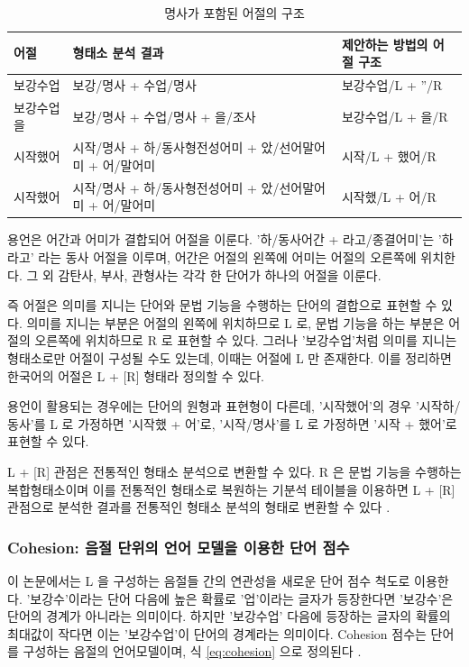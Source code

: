 \documentclass[11pt]{article}
\begin{document}
\begin{table}[H]
\small
\centering
\caption{명사가 포함된 어절의 구조}
\label{tab:three_example_of_begin}
\begin{tabular}{|l|l|l|}
\hline
\rowcolor[HTML]{EFEFEF} 
\textbf{어절} & \textbf{형태소 분석 결과} & \textbf{제안하는 방법의 어절 구조} \\ \hline
보강수업 & 보강/명사 + 수업/명사 & 보강수업/L + ''/R \\ \hline
보강수업을 & 보강/명사 + 수업/명사 + 을/조사 & 보강수업/L + 을/R \\ \hline
시작했어 & 시작/명사 + 하/동사형전성어미 + 았/선어말어미 + 어/말어미 & 시작/L + 했어/R \\ \hline
시작했어 & 시작/명사 + 하/동사형전성어미 + 았/선어말어미 + 어/말어미 & 시작했/L + 어/R \\ \hline
\end{tabular}
\end{table}

용언은 어간과 어미가 결합되어 어절을 이룬다.
'하/동사어간 + 라고/종결어미'는 '하라고' 라는 동사 어절을 이루며, 어간은 어절의 왼쪽에 어미는 어절의 오른쪽에 위치한다.
그 외 감탄사, 부사, 관형사는 각각 한 단어가 하나의 어절을 이룬다.

즉 어절은 의미를 지니는 단어와 문법 기능을 수행하는 단어의 결합으로 표현할 수 있다.
의미를 지니는 부분은 어절의 왼쪽에 위치하므로 L 로, 문법 기능을 하는 부분은 어절의 오른쪽에 위치하므로 R 로 표현할 수 있다.
그러나 '보강수업'처럼 의미를 지니는 형태소로만 어절이 구성될 수도 있는데, 이때는 어절에 L 만 존재한다.
이를 정리하면 한국어의 어절은 L + [R] 형태라 정의할 수 있다.

용언이 활용되는 경우에는 단어의 원형과 표현형이 다른데, '시작했어'의 경우 '시작하/동사'를 L 로 가정하면 '시작했 + 어'로, '시작/명사'를 L 로 가정하면 '시작 + 했어'로 표현할 수 있다.

L + [R] 관점은 전통적인 형태소 분석으로 변환할 수 있다.
R 은 문법 기능을 수행하는 복합형태소이며 이를 전통적인 형태소로 복원하는 기분석 테이블을 이용하면 L + [R] 관점으로 분석한 결과를 전통적인 형태소 분석의 형태로 변환할 수 있다 \citep{shim2013syllable}.

\subsubsection{Cohesion: 음절 단위의 언어 모델을 이용한 단어 점수}
이 논문에서는 L 을 구성하는 음절들 간의 연관성을 새로운 단어 점수 척도로 이용한다.
'보강수'이라는 단어 다음에 높은 확률로 '업'이라는 글자가 등장한다면 '보강수'은 단어의 경계가 아니라는 의미이다.
하지만 '보강수업' 다음에 등장하는 글자의 확률의 최대값이 작다면 이는 '보강수업'이 단어의 경계라는 의미이다.
Cohesion 점수는 단어를 구성하는 음절의 언어모델이며, 식 \ref{eq:cohesion} 으로 정의된다 \citep{kim2013cleansing}.
\end{document}
